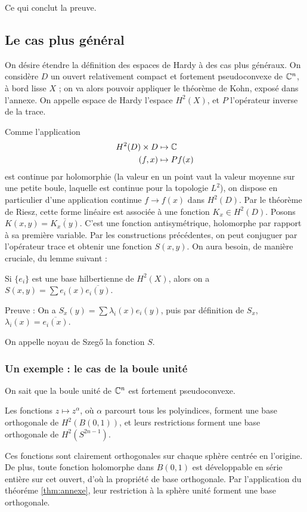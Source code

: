 Ce qui conclut la preuve.

\subsection{Le cas plus général}

On désire étendre la définition des espaces de Hardy à des cas plus généraux. On considère $D$ un ouvert relativement compact et fortement pseudoconvexe de $\mathbb{C}^n$, à bord lisse $X$ ; on va alors pouvoir appliquer le théorème de Kohn, exposé dans l'annexe. On appelle espace de Hardy l'espace $H^2(X)$, et $P$ l'opérateur inverse de la trace.

Comme l'application 
\begin{align*}
	H^2(D)\times D &\mapsto \mathbb{C}\\
	(f,x) &\mapsto Pf(x)
\end{align*} est continue par holomorphie (la valeur en un point vaut la valeur moyenne sur une petite boule, laquelle est continue pour la topologie $L^2$), on dispose en particulier d'une application continue $f \to f(x)$ dans $H^2(D)$. Par le théorème de Riesz, cette forme linéaire est associée à une fonction $K_x \in H^2(D)$. Posons $K(x,y) = \overline{K_x(y)}$. C'est une fonction antisymétrique, holomorphe par rapport à sa première variable. Par les constructions précédentes, on peut conjuguer par l'opérateur trace et obtenir une fonction $S(x,y)$. On aura besoin, de manière cruciale, du lemme suivant :

\begin{lem}
	Si $\{e_i\}$ est une base hilbertienne de $H^2(X)$, alors on a $S(x,y) = \sum e_i(x) \overline{e_i(y)}$.
\end{lem}

Preuve : On a $S_x(y) = \sum \lambda_i(x)e_i(y)$, puis par définition de $S_x$, $\lambda_i(x)= \overline{e_i(x)}$.

On appelle noyau de Szeg\H{o} la fonction $S$.

\subsubsection{Un exemple : le cas de la boule unité}
On sait que la boule unité de $\mathbb{C}^n$ est fortement pseudoconvexe. %

\begin{lem}
	Les fonctions $z \mapsto z^{\alpha}$, où $\alpha$ parcourt tous les polyindices, forment une base orthogonale de $H^2(B(0,1))$, et leurs restrictions forment une base orthogonale de $H^2(S^{2n-1})$.
\end{lem}
\begin{preuve}
	Ces fonctions sont clairement orthogonales sur chaque sphère centrée en l'origine. De plus, toute fonction holomorphe dans $B(0,1)$ est développable en série entière sur cet ouvert, d'où la propriété de base orthogonale. Par l'application du théoréme \ref{thm:annexe}, leur restriction à la sphère unité forment une base orthogonale.
\end{preuve}

